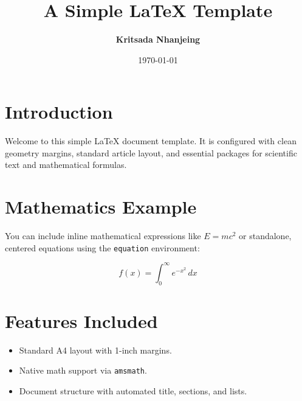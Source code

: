 \documentclass[11pt, a4paper]{article}
\title{\textbf{A Simple \LaTeX{} Template}}
\author{\textbf{Kritsada Nhanjeing}}
\date{\today}
\begin{document}
\maketitle

\section{Introduction}
Welcome to this simple \LaTeX{} document template. It is configured with clean geometry margins, standard article layout, and essential packages for scientific text and mathematical formulas.

\section{Mathematics Example}
You can include inline mathematical expressions like $E = mc^2$ or standalone, centered equations using the \texttt{equation} environment:

\begin{equation}
    f(x) = \int_{0}^{\infty} e^{-x^2} \, dx
\end{equation}

\section{Features Included}
\begin{itemize}
    \item Standard A4 layout with 1-inch margins.
    \item Native math support via \texttt{amsmath}.
    \item Document structure with automated title, sections, and lists.
\end{itemize}
\end{document}
